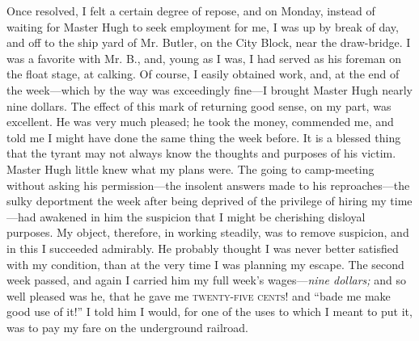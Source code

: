 Once resolved, I felt a certain degree of repose, and on Monday, instead
of waiting for Master Hugh to seek employment for me, I was up by break
of day, and off to the ship yard of Mr. Butler, on the City Block, near
the draw-bridge. I was a favorite with Mr. B., and, young as I was, I
had served as his foreman on the float stage, at calking. Of course, I
easily obtained work, and, at the end of the week---which by the way was
exceedingly fine---I brought Master Hugh nearly nine dollars. The effect
of this mark of returning good sense, on my part, was excellent. He was
very much pleased; he took the money, commended me, and told me I might
have done the same thing the week before. It is a blessed thing that the
tyrant may not always know the thoughts and purposes of his victim.
Master Hugh little knew what my plans were. The going to camp-meeting
without asking his permission---the insolent answers made to his
reproaches---the sulky deportment the week after being deprived of the
privilege of hiring my time---had awakened in him the suspicion that I
might be cherishing disloyal purposes. My object, therefore, in working
steadily, {}was to remove suspicion, and in this I succeeded admirably.
He probably thought I was never better satisfied with my condition, than
at the very time I was planning my escape. The second week passed, and
again I carried him my full week's wages---\emph{nine dollars;} and so
well pleased was he, that he gave me \textsc{twenty-five cents}! and
``bade me make good use of it!'' I told him I would, for one of the uses
to which I meant to put it, was to pay my fare on the underground
railroad.

